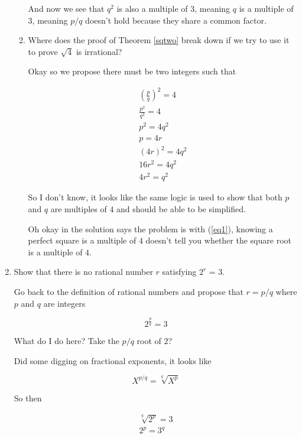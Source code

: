 \documentclass{article}
\numberwithin{equation}{subsection}
\numberwithin{theo}{subsection}
\begin{document}
\begin{enumerate}
\begin{enumerate}
And now we see that $q^2$ is also a multiple of $3$, meaning $q$ is a multiple
of $3$, meaning $p/q$ doesn't hold because they share a common factor.
    

            \item Where does the proof of Theorem \ref{sqtwo} break down if we
                try to use it to prove $\sqrt{4}$ is irrational?

Okay so we propose there must be two integers such that 

\begin{align}
    \left(\frac{p}{q}\right)^2 = 4\\
    \frac{p^2}{q^2} = 4\\
    p^2 = 4q^2\\
    p = 4r \label{eq1}\\
    (4r)^2 = 4q^2\\
    16r^2 = 4q^2\\
    4r^2 = q^2
\end{align}

So I don't know, it looks like the same logic is used to show that both $p$ and
$q$ are multiples of $4$ and should be able to be simplified.

Oh okay in the solution says the problem is with (\ref{eq1}), knowing a perfect
square is a multiple of $4$ doesn't tell you whether the square root is a
multiple of $4$.
    

        \end{enumerate}

    \item Show that there is no rational number $r$ satisfying $2^r$ = 3.

Go back to the definition of rational numbers and propose that $r = p/q$ where
$p$ and $q$ are integers

\begin{equation*}
    2^{\frac{p}{q}} = 3
\end{equation*}

What do I do here? Take the $p/q$ root of $2$? 

Did some digging on fractional exponents, it looks like

\begin{equation*}
    X^{p/q} = \sqrt[q]{X^p}
\end{equation*}

So then

\begin{align*}
    \sqrt[q]{2^p} = 3\\
    2^p = 3^q
\end{align*}


\end{enumerate}
\end{document}
